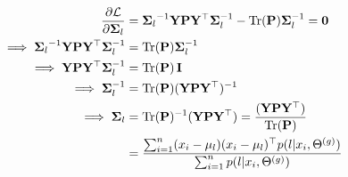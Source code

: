 \documentclass{article}
\def\L{{\cal L}}
\def\I{{\bf I}}
\def\P{{{\Pr}}}
\def\tr{\text{tr}}
\def\Y{{\bf Y}}
\def\P{{\bf P}}
\def\tr{\text{Tr}}
\def\SIGMA{{\boldsymbol \Sigma}}
\def\Y{{\mathbf Y}}
\begin{document}
\begin{equation}
\begin{split}
\frac{\partial \L}{ \partial \SIGMA_l} &=  
 {\SIGMA_l}^{-1}  \Y \P \Y^\top \SIGMA_l^{-1} - \tr(\P)  \SIGMA_l^{-1} = {\bf 0}  \\
\implies  {\SIGMA_l}^{-1}  \Y \P \Y^\top \SIGMA_l^{-1}  &=  \tr(\P)  \SIGMA_l^{-1} \\
\implies  \Y \P \Y^\top  \SIGMA_l^{-1}  &=  \tr(\P) \, \I \\
\implies  \SIGMA_l^{-1}  &=  \tr(\P)  (\Y \P \Y^\top)^{-1}  \\
\implies  \SIGMA_l  &=  \tr(\P)^{-1}  (\Y \P \Y^\top)
=  \frac{(\Y \P \Y^\top)}{\tr(\P) }\\
 &=  \frac{\sum_{i=1}^{n}  ( x_i - \mu_l) (x_i - \mu_l)^\top p(l | x_i,\Theta^{(g)})}{ \sum_{i=1}^{n} p(l | x_i,\Theta^{(g)})} \\
\end{split}
\end{equation}






\end{document}
